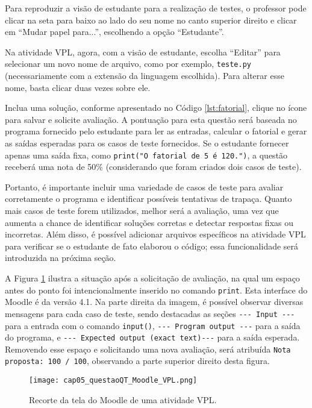 Para reproduzir a visão de estudante para a realização de testes, o professor pode clicar na seta para baixo ao lado do seu nome no canto superior direito e clicar em ``Mudar papel para...'', escolhendo a opção ``Estudante''.

Na atividade VPL, agora, com a visão de estudante, escolha ``Editar'' para selecionar um novo nome de arquivo, como por exemplo, \verb|teste.py| (necessariamente com a extensão da linguagem escolhida). Para alterar esse nome, basta clicar duas vezes sobre ele.

Inclua uma solução, conforme apresentado no Código \ref{lst:fatorial}, clique no ícone para salvar e solicite avaliação. A pontuação para esta questão será baseada no programa fornecido pelo estudante para ler as entradas, calcular o fatorial e gerar as saídas esperadas para os casos de teste fornecidos. Se o estudante fornecer apenas uma saída fixa, como \verb|print("O fatorial de 5 é 120.")|, a questão receberá uma nota de 50\% (considerando que foram criados dois casos de teste). 

Portanto, é importante incluir uma variedade de casos de teste para avaliar corretamente o programa e identificar possíveis tentativas de trapaça. Quanto mais casos de teste forem utilizados, melhor será a avaliação, uma vez que aumenta a chance de identificar soluções corretas e detectar respostas fixas ou incorretas. Além disso, é possível adicionar arquivos específicos na atividade VPL para verificar se o estudante de fato elaborou o código; essa funcionalidade será introduzida na próxima seção.

A Figura \ref{fig:cap05_questaoQT_Moodle_VPL} ilustra a situação após a solicitação de avaliação, na qual um espaço antes do ponto foi intencionalmente inserido no comando \verb|print|. Esta interface do Moodle é da versão 4.1. Na parte direita da imagem, é possível observar diversas mensagens para cada caso de teste, sendo destacadas as seções \verb|--- Input ---| para a entrada com o comando \verb|input()|, \verb|--- Program output ---| para a saída do programa, e \verb|--- Expected output (exact text)---| para a saída esperada. Removendo esse espaço e solicitando uma nova avaliação, será atribuída \verb|Nota proposta: 100 / 100|, observando a parte superior direito desta figura.


\begin{figure}[!ht]
  \texttt{[image: cap05\_questaoQT\_Moodle\_VPL.png]}
  \caption{Recorte da tela do Moodle de uma atividade VPL.}
  \label{fig:cap05_questaoQT_Moodle_VPL}
\end{figure}


